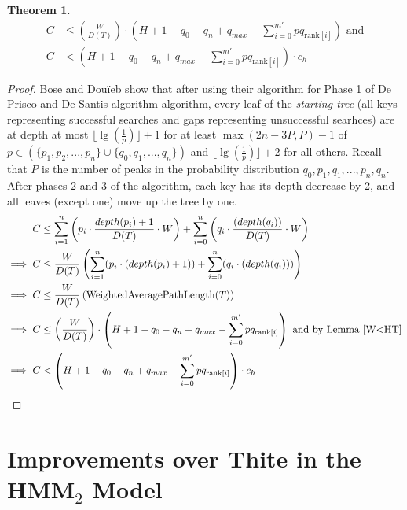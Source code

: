 \documentclass[letterpaper,12pt,titlepage,oneside,final]{book}
\theoremstyle{plain}
\newtheorem{thm}{Theorem}[section]
\begin{document}
\begin{thm} \label{ApproxBSTThm}
\begin{align*}
C &\leq  (\frac{W}{D(T)}) \cdot  (H + 1 - q_0 - q_n + q_{max} - \sum_{i=0}^{m'} pq_{\text{rank}[i]}) \text{ and} \\
C &<  (H + 1 - q_0 - q_n + q_{max} - \sum_{i=0}^{m'} pq_{\text{rank}[i]})\cdot c_h
\end{align*}
\end{thm}

\begin{proof}

Bose and Dou\"{i}eb show that after using their algorithm for Phase 1 of De Prisco and De Santis algorithm algorithm, every leaf of the \textit{starting tree} (all keys representing successful searches and gaps representing unsuccessful searhces) are at depth at most $\lfloor \lg(\frac{1}{p}) \rfloor + 1$  for at least $\max(2n-3P,P)-1$ of $p \in \left( \{p_1, p_2, ..., p_n \} \cup \{ q_0, q_1, ..., q_n \} \right)$ and $\lfloor \lg(\frac{1}{p}) \rfloor + 2$ for all others. Recall that $P$ is the number of peaks in the probability distribution $q_0, p_1, q_1, ..., p_n, q_n$. After phases 2 and 3 of the algorithm, each key has its depth decrease by 2, and all leaves (except one) move up the tree by one.
\begin{align*}
C &\leq \sum_{i=1}^{n} \left(p_i\cdot \frac{depth(p_i)+1}{D(T)}\cdot  W \right)+ \sum_{i=0}^{n} \left(q_i\cdot \frac{(depth(q_i))}{D(T)}\cdot  W \right) \\
\implies C &\leq \frac{W}{D(T)} \left(\sum_{i=1}^{n}(p_i\cdot (depth(p_i)+1))+ \sum_{i=0}^{n}(q_i\cdot (depth(q_i))) \right) \\
\implies C &\leq \frac{W}{D(T)} \left(\text{WeightedAveragePathLength}(T) \right) \\
\implies C &\leq  \left( \frac{W}{D(T)} \right) \cdot  \left(H + 1 - q_0 - q_n + q_{max} - \sum_{i=0}^{m'} pq_{\text{rank}[i]} \right) \text{ and by Lemma~\ref{W<HT}} \\
\implies C &<  \left(H + 1 - q_0 - q_n + q_{max} - \sum_{i=0}^{m'} pq_{\text{rank}[i]} \right)\cdot c_h
\end{align*}

\end{proof}


\section{Improvements over Thite in the HMM$_2$ Model}
\end{document}
